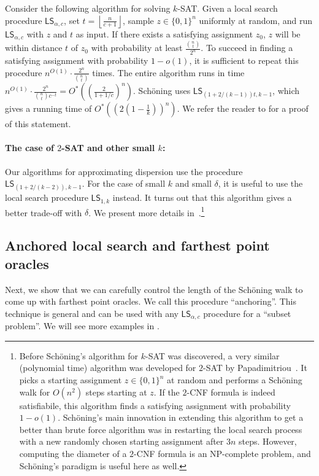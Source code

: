 \documentclass[11pt, letterpaper]{article}
\theoremstyle{definition}
\newcommand{\Q}[1]{\{0,1\}^{#1}}
\newcommand{\LS}{\textsf{LS}}
\newcommand{\sch}{Sch\"{o}ning\xspace}
\newcommand{\floor}[1]{{\left\lfloor{#1}\right\rfloor}}
\begin{document}
Consider the following algorithm for solving $k$-SAT. Given a local search procedure $\LS_{\alpha, c}$, set $t=\floor{\frac{n}{c+1}}$, sample $z \in \Q{n}$ uniformly at random, and run $\LS_{\alpha, c}$ with $z$ and $t$ as input. If there exists a satisfying assignment $z_0$, $z$ will be within distance $t$ of $z_0$ with probability at least $\frac{\binom{n}{t}}{2^n}$. To succeed in finding a satisfying assignment with probability $1-o(1)$, it is sufficient to repeat this procedure $n^{O(1)} \cdot \frac{2^n}{\binom{n}{t}}$ times. The entire algorithm runs in time $n^{O(1)} \cdot \frac{2^n}{\binom{n}{t}c^{-t}}= O^*\left( \left( \frac{2}{1+1/c}\right)^n \right)$. \sch uses $\LS_{\left(1+2/(k-1)\right)t, k-1}$, which gives a running time of $O^*\left( \left(  2\left(1-\frac{1}{k} \right) \right)^n\right)$. We refer the reader to  for a proof of this statement. 

\paragraph{The case of $2$-SAT and other small $k$:} Our algorithms for approximating dispersion use the procedure $\LS_{\left(1+2/(k-2)\right),k-1}$. For the case of small $k$ and small $\delta$, it is useful to use the local search procedure $\LS_{1,k}$ instead. It turns out that this algorithm gives a better trade-off with $\delta$. We present more details in~.\footnote{Before \sch's algorithm for $k$-SAT was discovered, a very similar (polynomial time) algorithm was developed for $2$-SAT by Papadimitriou~\cite{papadimitriou1991selecting}. It picks a starting assignment $z \in \{0,1\}^n$ at random and performs a \sch walk for $O(n^2)$ steps starting at $z$. If the $2$-CNF formula is indeed satisfiabile, this algorithm finds a satisfying assignment with probability $1-o(1)$. \sch's main innovation in extending this algorithm to get a better than brute force algorithm was in restarting the local search process with a new randomly chosen starting assignment after $3n$ steps. However, computing the diameter of a $2$-CNF formula is an NP-complete problem, and \sch's paradigm is useful here as well.}

\subsection{Anchored local search and farthest point oracles}
\label{sec:diamfarthest}

Next, we show that we can carefully control the length of the \sch walk to come up with farthest point oracles. We call this procedure ``anchoring''. This technique is general and can be used with any $\LS_{\alpha, c}$ procedure for a ``subset problem''. We will see more examples in 
. 
\end{document}

